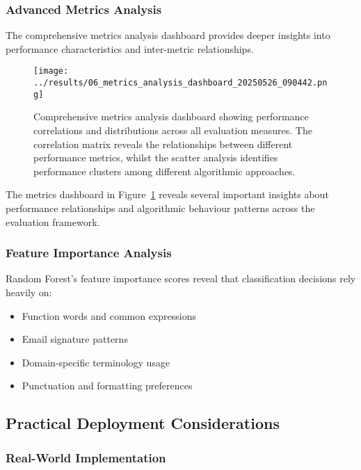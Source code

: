 \documentclass[11pt,a4paper]{article}
\begin{document}
\subsubsection{Advanced Metrics Analysis}

The comprehensive metrics analysis dashboard provides deeper insights into performance characteristics and inter-metric relationships.

\begin{figure}[H]
    \centering
    \texttt{[image: ../results/06\_metrics\_analysis\_dashboard\_20250526\_090442.png]}
    \caption{Comprehensive metrics analysis dashboard showing performance correlations and distributions across all evaluation measures. The correlation matrix reveals the relationships between different performance metrics, whilst the scatter analysis identifies performance clusters among different algorithmic approaches.}
    \label{fig:metrics_dashboard}
\end{figure}

The metrics dashboard in Figure~\ref{fig:metrics_dashboard} reveals several important insights about performance relationships and algorithmic behaviour patterns across the evaluation framework.

\subsubsection{Feature Importance Analysis}

Random Forest's feature importance scores reveal that classification decisions rely heavily on:

\begin{itemize}
    \item Function words and common expressions
    \item Email signature patterns
    \item Domain-specific terminology usage
    \item Punctuation and formatting preferences
\end{itemize}

\subsection{Practical Deployment Considerations}

\subsubsection{Real-World Implementation}
\end{document}
